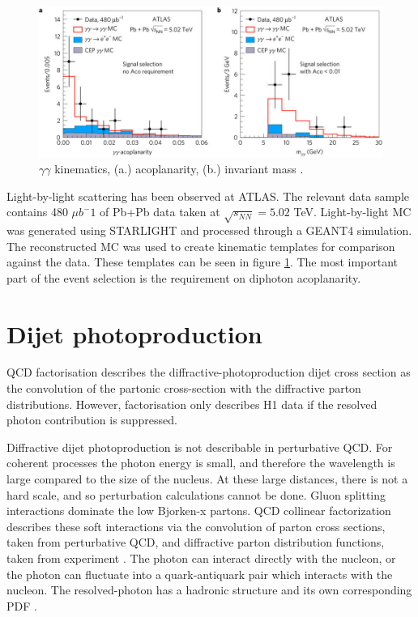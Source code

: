 \begin{figure}[]
\begin{centering}
\includegraphics[width=7in]{Chapter2/importfigs/nphys4208-f3.jpg}
\par\end{centering}
\caption{$\gamma \gamma$ kinematics, (a.) acoplanarity, (b.) invariant mass \cite{Aaboud:2017bwk}. \label{fig:ggKin}}
\end{figure}

Light-by-light scattering has been observed at ATLAS. The relevant data sample contains 480 $\mu b^-1$ of Pb+Pb data taken at $\sqrt{s_{NN}}=5.02$ TeV. Light-by-light MC was generated using STARLIGHT and processed through a GEANT4 simulation. The reconstructed MC was used to create kinematic templates for comparison against the data. These templates can be seen in figure \ref{fig:ggKin}. The most important part of the event selection is the requirement on diphoton acoplanarity. 

\section{Dijet photoproduction}

QCD factorisation describes the diffractive-photoproduction dijet cross section as the convolution of the partonic cross-section with the diffractive parton distributions. However, factorisation only describes H1 data if the resolved photon contribution is suppressed. 

Diffractive dijet photoproduction is not describable in perturbative QCD. For coherent processes the photon energy is small, and therefore the wavelength is large compared to the size of the nucleus. At these large distances, there is not a hard scale, and so perturbation calculations cannot be done. Gluon splitting interactions dominate the low Bjorken-x partons. QCD collinear factorization describes these soft interactions via the convolution of parton cross sections, taken from perturbative QCD, and diffractive parton distribution functions, taken from experiment \cite{Andreev:2015cwa,Chekanov:2008fh}. The photon can interact directly with the nucleon, or the photon can fluctuate into a quark-antiquark pair which interacts with the nucleon. The resolved-photon has a hadronic structure and its own corresponding PDF \cite{Bauer:1977iq}.

